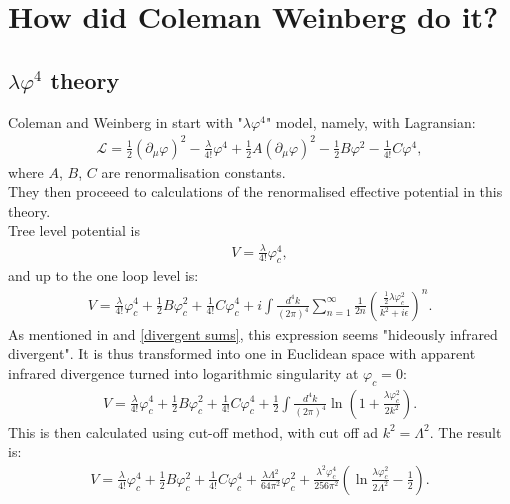 \chapter{How did Coleman Weinberg do it?}\label{CWchapter}
\section{\texorpdfstring{$\lambda\varphi^4$}{Lambda phi to the fourth} theory}
Coleman and Weinberg in \cite{Coleman1973} start with "$\lambda\varphi^4$" model, namely, with 
Lagransian:
\begin{align}
\mathcal{L} = \frac{1}{2}(\partial_\mu\varphi)^2-\frac{\lambda}{4!}\varphi^4+\frac{1}{2}
A(\partial_\mu\varphi)^2-\frac{1}{2}B\varphi^2-\frac{1}{4!}C\varphi^4,
\end{align}
where $A$, $B$, $C$ are renormalisation constants. \\
They then proceeed to calculations of the renormalised effective potential in this theory. \\
Tree level potential is
\begin{align}
V=\frac{\lambda}{4!}\varphi_c^4,
\end{align}
and up to the one loop level is:
\begin{align}
V = \frac{\lambda}{4!}\varphi_c^4+\frac{1}{2}B\varphi_c^2+\frac{1}{4!}C\varphi_c^4 + 
i\int\frac{d^4k}{(2\pi)^4}\sum\limits_{n=1}^\infty\frac{1}{2n}
\left(\frac{\frac{1}{2}\lambda\varphi_c^2}{k^2+i\epsilon}\right)^n.
\end{align} 
As mentioned in \cite{Coleman1973} and 
\ref{divergent sums}, this expression seems "hideously infrared divergent". It is thus transformed 
into one in Euclidean space with apparent infrared divergence turned into logarithmic 
singularity at $\varphi_c=0$:
\begin{align}
V=\frac{\lambda}{4!}\varphi_c^4+\frac{1}{2}B\varphi_c^2+\frac{1}{4!}C\varphi_c^4 +
\frac{1}{2}\int\frac{d^4k}{(2\pi)^4}\ln\left(1+\frac{\lambda\varphi_c^2}{2k^2}\right).
\end{align}
This is then calculated using cut-off method, with cut off ad $k^2 = \Lambda^2$. 
The result is:
\begin{align}
V=\frac{\lambda}{4!}\varphi_c^4+\frac{1}{2}B\varphi_c^2+\frac{1}{4!}C\varphi_c^4+
\frac{\lambda\Lambda^2}{64\pi^2}\varphi_c^2+\frac{\lambda^2\varphi_c^4}{256\pi^2}
\left(\ln\frac{\lambda\varphi_c^2}{2\Lambda^2}-\frac{1}{2}\right).
\end{align}
